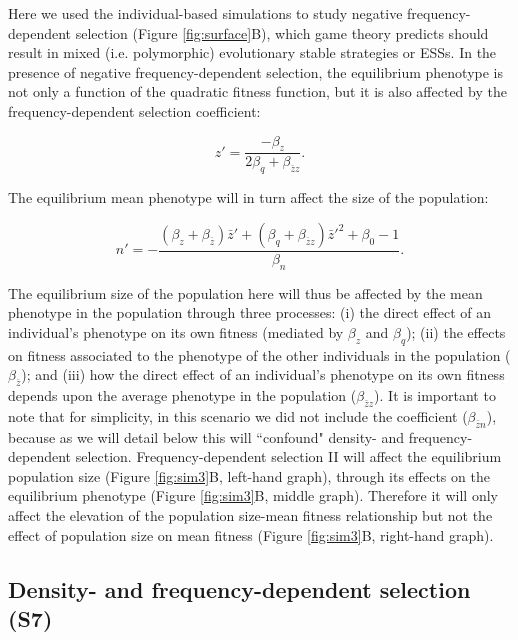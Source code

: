 \documentclass{article}
\begin{document}
\noindent Here we used the individual-based simulations to study negative frequency-dependent selection (Figure \ref{fig:surface}B), which game theory predicts should result in mixed (i.e. polymorphic) evolutionary stable strategies or ESSs. In the presence of negative frequency-dependent selection, the equilibrium phenotype is not only a function of the quadratic fitness function, but it is also affected by the frequency-dependent selection coefficient:

\begin{equation} 
z'=\frac{-\beta_{z}}{2\beta_{q} + \beta_{\bar{z}z}}.
\end{equation} 

\noindent The equilibrium mean phenotype will in turn affect the size of the population:

\begin{equation}
n' = -\frac{(\beta_{z}   + \beta_{\bar{z}})\bar{z}' + (\beta_{q} + \beta_{\bar{z}z})\bar{z}'^2+\beta_{0} -1}{\beta_{n}}.
\end{equation}

\noindent The equilibrium size of the population here will thus be affected by the mean phenotype in the population through three processes: (i) the direct effect of an individual's phenotype on its own fitness (mediated by $\beta_z$ and $ \beta_q$); (ii) the effects on fitness associated to the phenotype of the other individuals in the population ($\beta_{\bar{z}}$); and (iii) how the direct effect of an individual's phenotype on its own fitness depends upon the average phenotype in the population ($\beta_{\bar{z}z}$). It is important to note that for simplicity, in this scenario we did not include the coefficient ($\beta_{\bar{z}n}$), because as we will detail below this will ``confound" density- and frequency-dependent selection. Frequency-dependent selection II will affect the equilibrium population size (Figure \ref{fig:sim3}B, left-hand graph), through its effects on the equilibrium phenotype (Figure \ref{fig:sim3}B, middle graph). Therefore it will only affect the elevation of the population size-mean fitness relationship but not the effect of population size on mean fitness (Figure \ref{fig:sim3}B, right-hand graph).
 
 
 


\subsection{Density- and frequency-dependent selection (S7)}
\end{document}
